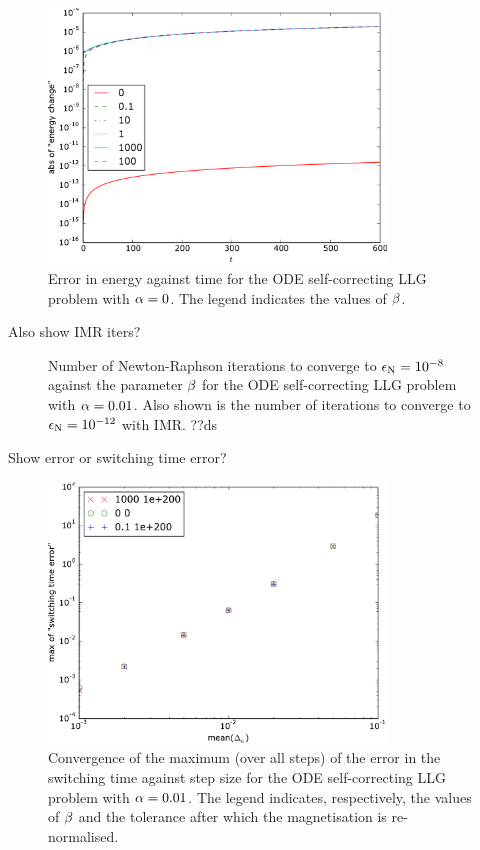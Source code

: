 \begin{figure}
  \centering
  \includegraphics[width=0.8\textwidth]{plots/self_correcting_ode/0-absofenergychangevstimes.pdf}
  \caption{
    Error in energy against time
    for the ODE self-correcting LLG problem
    with $\alpha = 0$.
    The legend indicates the values of $\beta$.
  }
  \label{fig:sc-energy-err}
\end{figure}


Also show IMR iters?
\begin{figure}
  \centering
  \caption{
    Number of Newton-Raphson iterations to converge to $\epsilon_{\mathrm{N}} = 10^{-8}$ against the parameter $\beta$
    for the ODE self-correcting LLG problem
    with $\alpha = 0.01$.
    Also shown is the number of iterations to converge to $\epsilon_{\mathrm{N}} = 10^{-12}$ with IMR. ??ds
  }
  \label{fig:sc-newt-iters}
\end{figure}

Show error or switching time error?
\begin{figure}
  \centering
  \includegraphics[width=0.8\textwidth]{plots/self_correcting_llg_ode_convergence/maxofswitchingtimeerrorvsmeanofdts}
  \caption{
    Convergence of the maximum (over all steps) of the error in the switching time
    against step size
    for the ODE self-correcting LLG problem with
    $\alpha = 0.01$.
    The legend indicates, respectively, the values of $\beta$ and the tolerance after which the magnetisation is re-normalised.
  }
  \label{fig:sc-convergence}
\end{figure}

